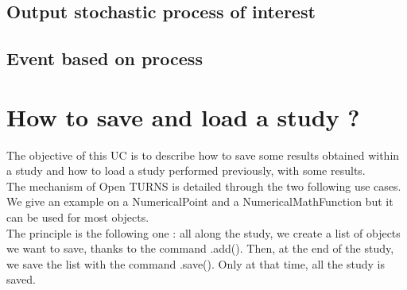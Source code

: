 \newpage \subsection{Output stochastic process of interest}


\newpage 

\newpage \subsection{Event based on process}



\newpage 


\clearpage \newpage \section{How to save and load a study ?}


The objective of this UC is to describe how to save some results obtained within a study and how to load a study performed previously, with some results.\\

The mechanism of Open TURNS is detailed through the two following use cases. We give an example on a NumericalPoint and a NumericalMathFunction but it can be used for most objects.\\

The principle is the following one : all along the study, we create a list of objects we want to save, thanks to the command .add(). Then, at the end of the study, we save the list with the command .save(). Only at that time, all the study is saved.



\newpage 






















